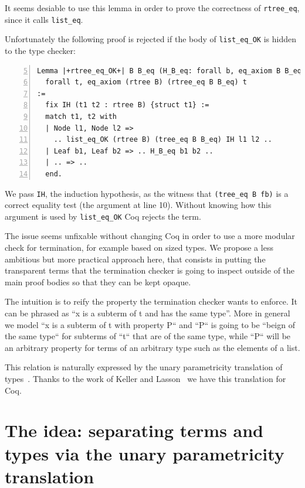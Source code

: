 \documentclass[sigplan,10pt,review]{acmart}\settopmatter{printfolios=true,printccs=false,printacmref=false}
\begin{document}
It seems desiable to use this lemma in order to prove the
correctness of \lstinline+rtree_eq+, since it calls
\lstinline+list_eq+.

Unfortunately the following proof is rejected if the body of
\lstinline+list_eq_OK+ is hidden to the type checker:

\begin{minipage}{\textwidth}\begin{lstlisting}[numbers=left,firstnumber=5]
Lemma |+rtree_eq_OK+| B B_eq (H_B_eq: forall b, eq_axiom B B_eq b) :
  forall t, eq_axiom (rtree B) (rtree_eq B B_eq) t
:= 
  fix IH (t1 t2 : rtree B) {struct t1} :=
  match t1, t2 with
  | Node l1, Node l2 =>
    .. list_eq_OK (rtree B) (tree_eq B B_eq) IH l1 l2 ..
  | Leaf b1, Leaf b2 => .. H_B_eq b1 b2 ..
  | .. => ..
  end.
\end{lstlisting}\end{minipage}

\noindent
We pass \lstinline+IH+, the induction hypothesis, as the
witness that \lstinline+(tree_eq B fb)+ is a correct equality test
(the argument at line 10). Without knowing how this argument is used
by \lstinline+list_eq_OK+ Coq rejects the term.

The issue seems unfixable without changing Coq in order to use a more
modular check for termination, for example based on sized
types\cite{sacchini:pastel-00622429}.
We propose a less ambitious but more practical approach here, that
consists in putting the transparent terms that the termination checker
is going to inspect outside of the main proof bodies so that they can be 
kept opaque.

The intuition is to reify the property the termination checker wants
to enforce. It can be phrased as ``x is a subterm of t and has the same
type''. More in general we model ``x is a subterm of t with property
P`` and ``P`` is going to be ``beign of the same type`` for subterms
of ``t`` that are of the same type, while ``P`` will be an arbitrary
property for terms of an arbitrary type such as the elements of
a list.

This relation is naturally expressed by the unary parametricity
translation of types~\cite{Wadler:1989:TF:99370.99404}.
Thanks to the work of Keller and
Lasson~\cite{keller:hal-00730913} we have this translation for Coq.


\section{The idea: separating terms and types via the unary parametricity translation}
\label{sec:idea}
\end{document}
